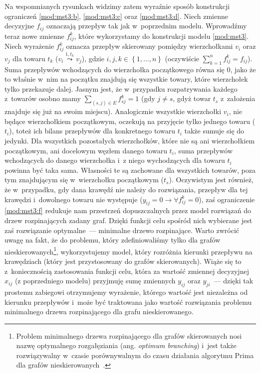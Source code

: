 Na wspomnianych rysunkach widzimy zatem wyraźnie sposób konstrukcji ograniczeń \ref{mod:mst3:b}, \ref{mod:mst3:c} oraz \ref{mod:mst3:d}.
Niech zmienne decyzyjne $f_{ij}$ oznaczają przepływ tak jak w~poprzednim modelu.
Wprowadźmy teraz nowe zmienne $f^{k}_{ij}$, które wykorzystamy do konstrukcji modelu \ref{mod:mst3}.
Niech wyrażenie $f^{k}_{ij}$ oznacza przepływ skierowany pomiędzy wierzchołkami $v_{i}$ oraz $v_{j}$ dla towaru $t_{k}$ ($v_{i} \overset{1, t_{k}}{\leadsto} v_{j}$), gdzie $i, j, k \in \left\{ 1, \dots, n \right\}$ (oczywiście $\sum_{k=1}^{n} f^{k}_{ij} = f_{ij}$).
Suma przepływów wchodzących do wierzchołka początkowego równa się $0$, jako że to właśnie w~nim na początku znajdują się wszystkie towary, które wierzchołek tylko przekazuje dalej.
Jasnym jest, że w~przypadku rozpatrywania każdego z~towarów osobno mamy $\sum_{\left( s, j \right ) \in E} f^{k}_{sj} = 1$ (gdy $j \neq s$, gdyż towar $t_{s}$ z~założenia znajduje się już na swoim miejscu).
Analogicznie wszystkie wierzchołki $v_{i}$, nie będące wierzchołkiem początkowym, oczekują na przyjęcie tylko jednego towaru ($t_{i}$), toteż ich bilans przepływów dla konkretnego towaru $t_{i}$ także sumuje się do jedynki.
Dla wszystkich pozostałych wierzchołków, które nie są ani wierzchołkiem początkowym, ani docelowym węzłem danego towaru $t_{i}$, suma przepływów wchodzących do danego wierzchołka i~z niego wychodzących dla towaru $t_{i}$ powinna być taka sama.
Własności te są zachowane dla wszystkich towarów, poza tym znajdującym się w~wierzchołku początkowym ($t_{s}$).
Oczywistym jest również, że w~przypadku, gdy dana krawędź nie należy do rozwiązania, przepływ dla tej krawędzi i~dowolnego towaru nie występuje ($y_{ij} = 0 \rightarrow \forall f_{ij}^{k} = 0$), zaś ograniczenie \ref{mod:mst3:f} redukuje nam przestrzeń dopuszczalnych przez model rozwiązań do drzew rozpinających zadany graf.
Dzięki funkcji celu spośród nich wybierane jest zaś rozwiązanie optymalne~--- minimalne drzewo rozpinające.
Warto zwrócić uwagę na fakt, że do problemu, który zdefiniowaliśmy tylko dla grafów nieskierowanych\footnote{
	Problem minimalnego drzewa rozpinającego dla grafów skierowanych nosi nazwę optymalnego rozgałęziania (ang. \textit{optimum branching}) i~jest także rozwiązywalny w~czasie porównywalnym do czasu działania algorytmu Prima dla grafów nieskierowanych~\cite{NET:NET3230070103}.
}, wykorzystujemy model, który rozróżnia kierunki przepływu na krawędziach (który jest przystosowany do grafów skierowanych).
Wiąże się to z~koniecznością zastosowania funkcji celu, która za wartość zmiennej decyzyjnej $x_{ij}$ (z poprzedniego modelu) przyjmuję sumę zmiennych $y_{ij}$ oraz $y_{ji}$~--- dzięki tak prostemu zabiegowi otrzymujemy wyrażenie, którego wartość jest niezależna od kierunku przepływów i~może być traktowana jako wartość rozwiązania problemu minimalnego drzewa rozpinającego dla grafu nieskierowanego.




